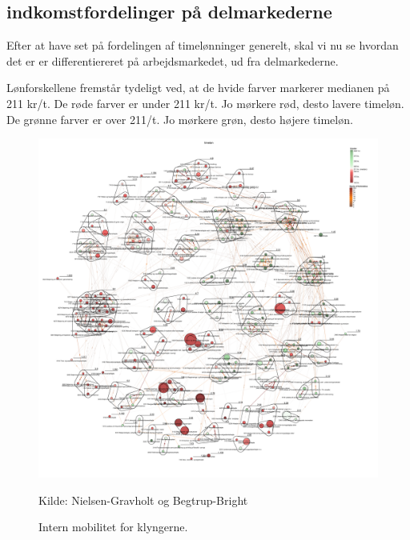 %
\subsection{indkomstfordelinger på delmarkederne}
%

Efter at have set på fordelingen af timelønninger generelt, skal vi nu se hvordan det er er differentiereret på arbejdsmarkedet, ud fra delmarkederne. 



Lønforskellene fremstår tydeligt ved, at de hvide farver markerer medianen på 211 kr/t. De røde farver er under 211 kr/t. Jo mørkere rød, desto lavere timeløn. De grønne farver er over 211/t. Jo mørkere grøn, desto højere timeløn.

\begin{figure}[H]
\begin{center}
  \caption{Intern mobilitet for klyngerne.}
  \label{fig_analyse_deskriptivt_kort_timelon}
  \includegraphics[width=1.0\textwidth]{fig/netvaerkskort/kort_timelon.pdf}
  \centerline{ \tiny{Kilde: Nielsen-Gravholt og Begtrup-Bright}}
\end{center}
\end{figure}
\restoregeometry





